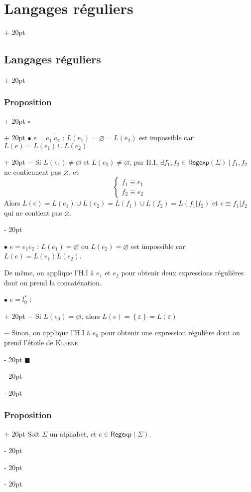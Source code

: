 \documentclass[a4paper, 12pt, twoside]{article}
\newcommand{\set}[1]{\left\{ #1 \right\}}
\newcommand{\ind}[1][20pt]{\advance\leftskip + #1}
\newcommand{\deind}[1][20pt]{\advance\leftskip - #1}
\newenvironment{indt}[2][20pt]{#2 \par \ind[#1]}{\par \deind} %
\newenvironment{proof}[1][{}]{\begin{indt}{$\square$ #1}}{$\blacksquare$ \end{indt}}
\newcommand{\Regexp}{\mathsf{Regexp}}
\begin{document}
\begin{indt}{\section{Langages réguliers}}
\begin{indt}{\subsection{Langages réguliers}}
\begin{indt}{\subsubsection{Proposition}}
\begin{proof}
\begin{indt}{$\bullet$ $e = e_1 | e_2$ : $L(e_1) = \varnothing = L(e_2)$ est impossible car $L(e) = L(e_1) \cup L(e_2)$}
                        $-$ Si $L(e_1) \neq \varnothing$ et $L(e_2) \neq \varnothing$, par H.I, $\exists f_1, f_2 \in \Regexp(\Sigma)\ |\ f_1, f_2$ ne contiennent pas $\varnothing$, et
                        \[
                            \begin{cases}
                                f_1 \equiv e_1
                                \\
                                f_2 \equiv e_2
                            \end{cases}
                        \]
                        Alors $L(e) = L(e_1) \cup L(e_2) = L(f_1) \cup L(f_2) = L(f_1 | f_2)$
                        et $e \equiv f_1 | f_2$ qui ne contient pas $\varnothing$.
                    \end{indt}

                    \vspace{6pt}
                    
                    $\bullet$ $e = e_1 e_2$ : $L(e_1) = \varnothing$ ou $L(e_2) = \varnothing$ est impossible car $L(e) = L(e_1) L(e_2)$.

                    De même, on applique l'H.I à $e_1$ et $e_2$ pour obtenir deux expressions régulières dont on prend la concaténation.

                    \vspace{6pt}
                    
                    \begin{indt}{$\bullet$ $e = l_0^*$ :}
                        $-$ Si $L(e_0) = \varnothing$, alors $L(e) = \set \varepsilon = L(\varepsilon)$

                        $-$ Sinon, on applique l'H.I à $e_0$ pour obtenir une expression régulière dont on prend l'étoile de \textsc{Kleene}
                    \end{indt}
                \end{proof}
            \end{indt}

            \vspace{12pt}
            
            \begin{indt}{\subsubsection{Proposition}}
                Soit $\Sigma$ un alphabet, et $e \in \Regexp(\Sigma)$.


\end{indt}
\end{indt}
\end{indt}
\end{document}
